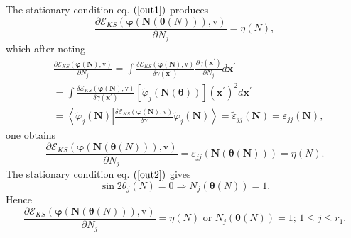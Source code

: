 \documentclass[aps,preprint]{revtex4}%
\begin{document}
The stationary condition eq. $\left(  \ref{out1}\right)  $ produces
\begin{equation}
\frac{\partial\mathcal{E}_{KS}\left(  \mathbf{\varphi}\left(  \mathbf{N}%
\left(  \mathbf{\theta}\left(  N\right)  \right)  \right)  \mathbf{,}%
\mathrm{v}\right)  }{\partial N_{j}}=\eta\left(  N\right)  ,
\end{equation}
which after noting
\begin{align}
&  \frac{\partial\mathcal{E}_{KS}\left(  \mathbf{\varphi}\left(
\mathbf{N}\right)  \mathbf{,}\mathrm{v}\right)  }{\partial N_{j}}=\int
\frac{\delta\mathcal{E}_{KS}\left(  \mathbf{\varphi}\left(  \mathbf{N}\right)
\mathbf{,}\mathrm{v}\right)  }{\delta\gamma\left(  \mathbf{x}^{\prime}\right)
}\frac{\partial\gamma\left(  \mathbf{x}^{\prime}\right)  }{\partial N_{j}%
}d\mathbf{x}^{\prime}\nonumber\\
&  =\int\frac{\delta\mathcal{E}_{KS}\left(  \mathbf{\varphi}\left(
\mathbf{N}\right)  \mathbf{,}\mathrm{v}\right)  }{\delta\gamma\left(
\mathbf{x}^{\prime}\right)  }\left[  \tilde{\varphi}_{j}\left(  \mathbf{N}%
\left(  \mathbf{\theta}\right)  \right)  \right]  \left(  \mathbf{x}^{\prime
}\right)  ^{2}d\mathbf{x}^{\prime}\nonumber\\
&  =\left\langle \tilde{\varphi}_{j}\left(  \mathbf{N}\right)  \left\vert
\frac{\delta\mathcal{E}_{KS}\left(  \mathbf{\varphi}\left(  \mathbf{N}\right)
\mathbf{,}\mathrm{v}\right)  }{\delta\gamma}\tilde{\varphi}_{j}\left(
\mathbf{N}\right)  \right.  \right\rangle =\tilde{\varepsilon}_{jj}%
\mathbf{\left(  \mathbf{N}\right)  }=\varepsilon_{jj}\mathbf{\left(
\mathbf{N}\right)  },
\end{align}
one obtains
\begin{equation}
\frac{\partial\mathcal{E}_{KS}\left(  \mathbf{\varphi}\left(  \mathbf{N}%
\left(  \mathbf{\theta}\left(  N\right)  \right)  \right)  \mathbf{,}%
\mathrm{v}\right)  }{\partial N_{j}}=\varepsilon_{jj}\mathbf{\left(
\mathbf{N}\left(  \mathbf{\theta}\left(  N\right)  \right)  \right)  }%
=\eta\left(  N\right)  .
\end{equation}
The stationary condition eq. $\left(  \ref{out2}\right)  $ gives
\begin{equation}
\sin2\theta_{j}\left(  N\right)  =0\Rightarrow N_{j}\left(  \mathbf{\theta
}\left(  N\right)  \right)  =1.
\end{equation}
Hence
\begin{equation}
\frac{\partial\mathcal{E}_{KS}\left(  \mathbf{\varphi}\left(  \mathbf{N}%
\left(  \mathbf{\theta}\left(  N\right)  \right)  \right)  \mathbf{,}%
\mathrm{v}\right)  }{\partial N_{j}}=\eta\left(  N\right)  \text{ or }%
N_{j}\left(  \mathbf{\theta}\left(  N\right)  \right)  =1;\,1\leq j\leq r_{1}.
\end{equation}
\end{document}

